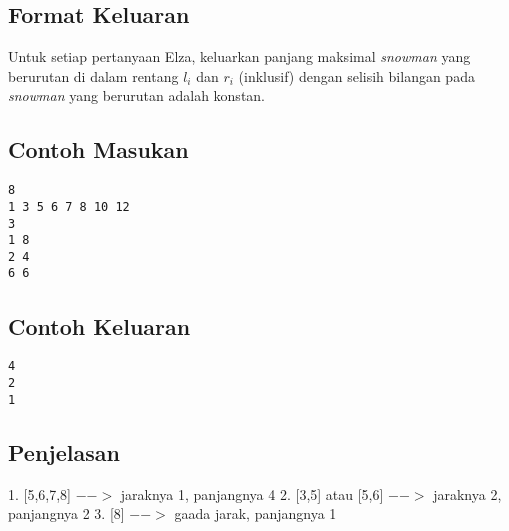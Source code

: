 \documentclass{article}
\begin{document}
\subsection*{Format Keluaran}
Untuk setiap pertanyaan Elza, keluarkan panjang maksimal \textit{snowman} yang berurutan di dalam rentang $l_i$ dan $r_i$ (inklusif) 
dengan selisih bilangan pada \textit{snowman} yang berurutan adalah konstan.
\\

\begin{multicols}{2}
\subsection*{Contoh Masukan}
\begin{lstlisting}
8
1 3 5 6 7 8 10 12
3
1 8
2 4
6 6
\end{lstlisting}
\columnbreak
\subsection*{Contoh Keluaran}
\begin{lstlisting}
4
2
1
\end{lstlisting}
\vfill
\null
\end{multicols}

\subsection*{Penjelasan}
1. [5,6,7,8] $-->$ jaraknya 1, panjangnya 4
2. [3,5] atau [5,6] $-->$ jaraknya 2, panjangnya 2
3. [8] $-->$ gaada jarak, panjangnya 1


\pagebreak
\end{document}

